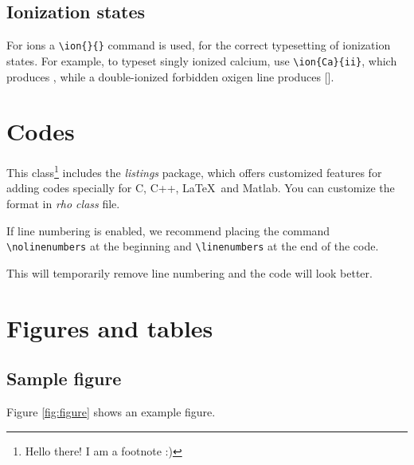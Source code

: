 \documentclass[11pt,proc,twoside]{RMxAC_rho-class/RMxAC_rho}
\begin{document}
\subsection{Ionization states}

For ions a \verb'\ion{}{}' command is used, for the correct typesetting of ionization states.
For example, to typeset singly ionized calcium, use \verb'\ion{Ca}{ii}', which produces , while a double-ionized forbidden oxigen line produces [].

\section{Codes}

    This class\footnote{Hello there! I am a footnote :)} includes the \textit{listings} package, which offers customized features for adding codes specially for C, C++, \LaTeX\ and Matlab. You can customize the format in \textit{rho class} file.

    \nolinenumbers
    
    \linenumbers
    
    If line numbering is enabled, we recommend placing the command \verb|\nolinenumbers| at the beginning and \verb|\linenumbers| at the end of the code. 
    
    This will temporarily remove line numbering and the code will look better.
    


\section{Figures and tables}

    \subsection{Sample figure}

        Figure \ref{fig:figure} shows an example figure.
        
\end{document}
